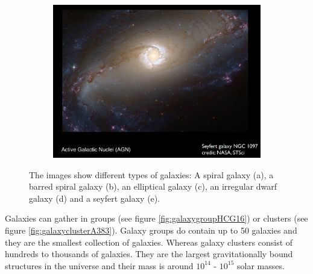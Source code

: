 \begin{figure}[H]
\begin{subfigure}[b]{0.49\textwidth}
			\caption{}
			\label{fig:dwarfirregularNGC1427A}
		\end{subfigure}
		\begin{subfigure}[b]{0.55\textwidth}
			\includegraphics[width=1\linewidth]{img/ch-01/seyfertNGC1097.png}
			\caption{}
			\label{fig:seyfertNGC1097}
		\end{subfigure}
\caption{The images show different types of galaxies: A spiral galaxy (a), a barred spiral galaxy (b), an elliptical galaxy (c), an irregular dwarf galaxy (d) and a seyfert galaxy (e).}
\end{figure}
Galaxies can gather in groups (see figure \ref{fig:galaxygroupHCG16}) or clusters (see figure \ref{fig:galaxyclusterA383}). Galaxy groups do contain up to 50 galaxies and they are the smallest collection of galaxies. Whereas galaxy clusters consist of hundreds to thousands of galaxies. They are the largest gravitationally bound structures in the universe and their mass is around $10^{14}$ - $10^{15}$ solar masses.
